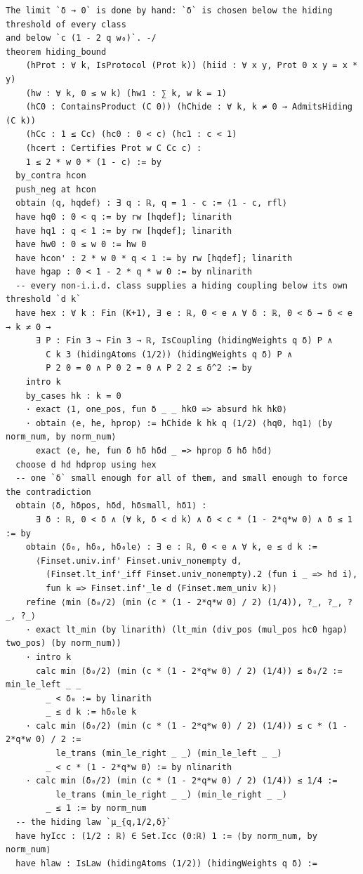 \documentclass[11pt,a4paper]{article}
\theoremstyle{definition}
\theoremstyle{remark}
\begin{document}
\begin{Verbatim}[fontsize=\scriptsize,formatcom=\leanmono,samepage=false]
The limit `δ → 0` is done by hand: `δ` is chosen below the hiding threshold of every class
and below `c (1 - 2 q w₀)`. -/
theorem hiding_bound
    (hProt : ∀ k, IsProtocol (Prot k)) (hiid : ∀ x y, Prot 0 x y = x * y)
    (hw : ∀ k, 0 ≤ w k) (hw1 : ∑ k, w k = 1)
    (hC0 : ContainsProduct (C 0)) (hChide : ∀ k, k ≠ 0 → AdmitsHiding (C k))
    (hCc : 1 ≤ Cc) (hc0 : 0 < c) (hc1 : c < 1)
    (hcert : Certifies Prot w C Cc c) :
    1 ≤ 2 * w 0 * (1 - c) := by
  by_contra hcon
  push_neg at hcon
  obtain ⟨q, hqdef⟩ : ∃ q : ℝ, q = 1 - c := ⟨1 - c, rfl⟩
  have hq0 : 0 < q := by rw [hqdef]; linarith
  have hq1 : q < 1 := by rw [hqdef]; linarith
  have hw0 : 0 ≤ w 0 := hw 0
  have hcon' : 2 * w 0 * q < 1 := by rw [hqdef]; linarith
  have hgap : 0 < 1 - 2 * q * w 0 := by nlinarith
  -- every non-i.i.d. class supplies a hiding coupling below its own threshold `d k`
  have hex : ∀ k : Fin (K+1), ∃ e : ℝ, 0 < e ∧ ∀ δ : ℝ, 0 < δ → δ < e → k ≠ 0 →
      ∃ P : Fin 3 → Fin 3 → ℝ, IsCoupling (hidingWeights q δ) P ∧
        C k 3 (hidingAtoms (1/2)) (hidingWeights q δ) P ∧
        P 2 0 = 0 ∧ P 0 2 = 0 ∧ P 2 2 ≤ δ^2 := by
    intro k
    by_cases hk : k = 0
    · exact ⟨1, one_pos, fun δ _ _ hk0 => absurd hk hk0⟩
    · obtain ⟨e, he, hprop⟩ := hChide k hk q (1/2) ⟨hq0, hq1⟩ ⟨by norm_num, by norm_num⟩
      exact ⟨e, he, fun δ hδ hδd _ => hprop δ hδ hδd⟩
  choose d hd hdprop using hex
  -- one `δ` small enough for all of them, and small enough to force the contradiction
  obtain ⟨δ, hδpos, hδd, hδsmall, hδ1⟩ :
      ∃ δ : ℝ, 0 < δ ∧ (∀ k, δ < d k) ∧ δ < c * (1 - 2*q*w 0) ∧ δ ≤ 1 := by
    obtain ⟨δ₀, hδ₀, hδ₀le⟩ : ∃ e : ℝ, 0 < e ∧ ∀ k, e ≤ d k :=
      ⟨Finset.univ.inf' Finset.univ_nonempty d,
        (Finset.lt_inf'_iff Finset.univ_nonempty).2 (fun i _ => hd i),
        fun k => Finset.inf'_le d (Finset.mem_univ k)⟩
    refine ⟨min (δ₀/2) (min (c * (1 - 2*q*w 0) / 2) (1/4)), ?_, ?_, ?_, ?_⟩
    · exact lt_min (by linarith) (lt_min (div_pos (mul_pos hc0 hgap) two_pos) (by norm_num))
    · intro k
      calc min (δ₀/2) (min (c * (1 - 2*q*w 0) / 2) (1/4)) ≤ δ₀/2 := min_le_left _ _
        _ < δ₀ := by linarith
        _ ≤ d k := hδ₀le k
    · calc min (δ₀/2) (min (c * (1 - 2*q*w 0) / 2) (1/4)) ≤ c * (1 - 2*q*w 0) / 2 :=
          le_trans (min_le_right _ _) (min_le_left _ _)
        _ < c * (1 - 2*q*w 0) := by nlinarith
    · calc min (δ₀/2) (min (c * (1 - 2*q*w 0) / 2) (1/4)) ≤ 1/4 :=
          le_trans (min_le_right _ _) (min_le_right _ _)
        _ ≤ 1 := by norm_num
  -- the hiding law `μ_{q,1/2,δ}`
  have hyIcc : (1/2 : ℝ) ∈ Set.Icc (0:ℝ) 1 := ⟨by norm_num, by norm_num⟩
  have hlaw : IsLaw (hidingAtoms (1/2)) (hidingWeights q δ) :=

\end{Verbatim}
\end{document}
